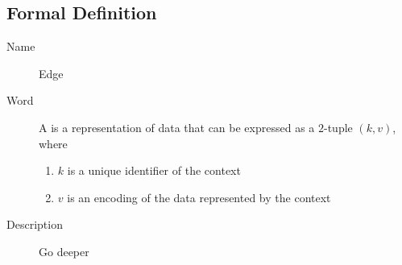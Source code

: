 
\subsection{Formal Definition}

\begin{description}
    \item[Name] Edge \vspace{2mm}
    \item[Word] \begin{definition}[action]
              A \textbf{} is a representation of data that can be expressed as a $2$-tuple $(k,v)$, where
              \begin{enumerate}
                  \item $k$ is a unique identifier of the context
                  \item $v$ is an encoding of the data represented by the context
              \end{enumerate}
          \end{definition}
    \item[Description] Go deeper
\end{description}
